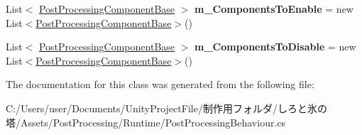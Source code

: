 \begin{DoxyCompactItemize}
List$<$ \hyperlink{class_unity_engine_1_1_post_processing_1_1_post_processing_component_base}{Post\+Processing\+Component\+Base} $>$ {\bfseries m\+\_\+\+Components\+To\+Enable} = new List$<$\hyperlink{class_unity_engine_1_1_post_processing_1_1_post_processing_component_base}{Post\+Processing\+Component\+Base}$>$()
\item 
\mbox{\label{class_unity_engine_1_1_post_processing_1_1_post_processing_behaviour_a6884e92159569b6863daa4d993278294}} 
List$<$ \hyperlink{class_unity_engine_1_1_post_processing_1_1_post_processing_component_base}{Post\+Processing\+Component\+Base} $>$ {\bfseries m\+\_\+\+Components\+To\+Disable} = new List$<$\hyperlink{class_unity_engine_1_1_post_processing_1_1_post_processing_component_base}{Post\+Processing\+Component\+Base}$>$()
\end{DoxyCompactItemize}


The documentation for this class was generated from the following file\+:\begin{DoxyCompactItemize}
\item 
C\+:/\+Users/user/\+Documents/\+Unity\+Project\+File/制作用フォルダ/しろと氷の塔/\+Assets/\+Post\+Processing/\+Runtime/Post\+Processing\+Behaviour.\+cs\end{DoxyCompactItemize}
